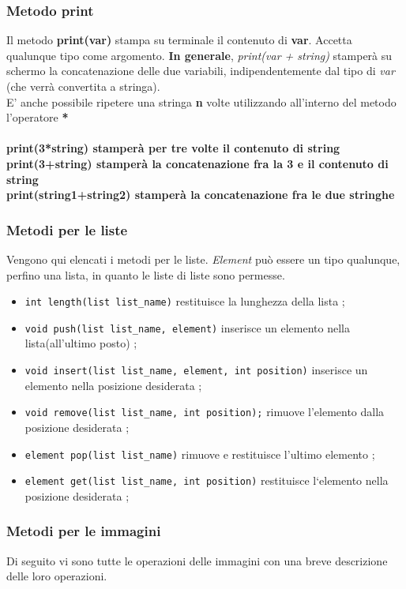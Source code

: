 \documentclass[10pt]{article}
\begin{document}
\subsubsection{Metodo print}
Il metodo \textbf{print(var)} stampa su terminale il contenuto di \textbf{var}. Accetta qualunque tipo come argomento. 
\textbf{In generale}, \textit{print(var + string)} stamperà su schermo la concatenazione delle due variabili, indipendentemente dal tipo di \textit{var} (che verrà convertita a stringa).\\ 
E' anche possibile ripetere una stringa \textbf{n} volte utilizzando all'interno del metodo l'operatore \textbf{*}\\\\
\textbf{print(3*string) stamperà per tre volte il contenuto di string}\\
\textbf{print(3+string) stamperà la concatenazione fra la 3 e il contenuto di string}\\
\textbf{print(string1+string2) stamperà la concatenazione fra le due stringhe}\\

\subsubsection{Metodi per le liste}
Vengono qui elencati i metodi per le liste. \textit{Element} può essere un tipo qualunque, perfino una lista, in quanto le liste di liste sono permesse.\\

\begin{itemize}
\item \texttt{int length(list list\_name)} restituisce la lunghezza della lista ;
\item \texttt{void push(list list\_name, element)} inserisce un elemento nella lista(all'ultimo posto) ;
\item \texttt{void insert(list list\_name, element, int position)} inserisce un elemento nella posizione desiderata ;
\item \texttt{void remove(list list\_name, int position);} rimuove l’elemento dalla posizione desiderata ;
\item \texttt{element pop(list list\_name)} rimuove e restituisce l’ultimo elemento ;	
\item \texttt{element get(list list\_name, int position)} restituisce l‘elemento nella posizione desiderata ;
\end{itemize}

\subsubsection{Metodi per le immagini}
Di seguito vi sono tutte le operazioni delle immagini con una breve descrizione delle loro operazioni.\\
\end{document}
